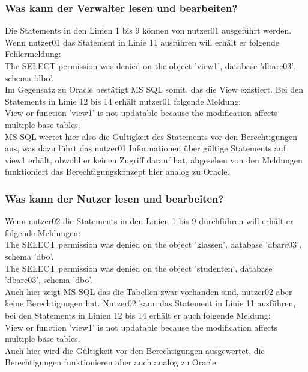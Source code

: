 \documentclass[10pt]{scrreprt}
\begin{document}
\subsubsection{Was kann der Verwalter lesen und bearbeiten?}
Die Statements in den Linien 1 bis 9 können von nutzer01 ausgeführt werden. Wenn nutzer01 das Statement in Linie 11 ausführen will erhält er folgende Fehlermeldung:\\
The SELECT permission was denied on the object 'view1', database 'dbarc03', schema 'dbo'.\\
Im Gegensatz zu Oracle bestätigt MS SQL somit, das die View existiert. Bei den Statements in Linie 12 bis 14 erhält nutzer01 folgende Meldung:\\
View or function 'view1' is not updatable because the modification affects multiple base tables.\\
MS SQL wertet hier also die Gültigkeit des Statements vor den Berechtigungen aus, was dazu führt das nutzer01 Informationen über gültige Statements auf view1 erhält, obwohl er keinen Zugriff darauf hat, abgesehen von den Meldungen funktioniert das Berechtigungskonzept hier analog zu Oracle.
\subsubsection{Was kann der Nutzer lesen und bearbeiten?}
Wenn nutzer02 die Statements in den Linien 1 bis 9 durchführen will erhält er folgende Meldungen:\\
The SELECT permission was denied on the object 'klassen', database 'dbarc03', schema 'dbo'.\\
The SELECT permission was denied on the object 'studenten', database 'dbarc03', schema 'dbo'.\\
Auch hier zeigt MS SQL das die Tabellen zwar vorhanden sind, nutzer02 aber keine Berechtigungen hat. Nutzer02 kann das Statement in Linie 11 ausführen, bei den Statements in Linien 12 bis 14 erhält er auch folgende Meldung:\\
View or function 'view1' is not updatable because the modification affects multiple base tables.\\
Auch hier wird die Gültigkeit vor den Berechtigungen ausgewertet, die Berechtigungen funktionieren aber auch analog zu Oracle.
\end{document}
